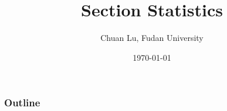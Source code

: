 




\title[Section Stat]{Section Statistics} %

\author{Chuan Lu, Fudan University} %
\institute[Fudan]
{} %
\date{\today} %



\begin{frame}
\titlepage %
\end{frame}

\begin{frame}
\frametitle{Outline} %
\tableofcontents %
\end{frame}

